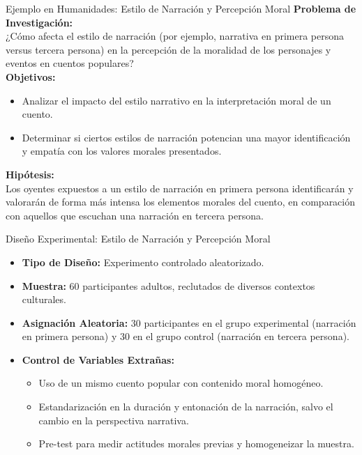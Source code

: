 ﻿\documentclass{beamer}
\begin{document}
\begin{frame}{Ejemplo en Humanidades:  Estilo de Narración y Percepción Moral}
  \textbf{Problema de Investigación:}\\
  ¿Cómo afecta el estilo de narración (por ejemplo, narrativa en primera persona versus tercera persona) en la percepción de la moralidad de los personajes y eventos en cuentos populares?\\[3mm]
  
  \textbf{Objetivos:}
  \begin{itemize}
      \item Analizar el impacto del estilo narrativo en la interpretación moral de un cuento.
      \item Determinar si ciertos estilos de narración potencian una mayor identificación y empatía con los valores morales presentados.
  \end{itemize}
  
  \textbf{Hipótesis:}\\
  Los oyentes expuestos a un estilo de narración en primera persona identificarán y valorarán de forma más intensa los elementos morales del cuento, en comparación con aquellos que escuchan una narración en tercera persona.
\end{frame}

\begin{frame}{Diseño Experimental: Estilo de Narración y Percepción Moral}
  \begin{itemize}
      \item \textbf{Tipo de Diseño:} Experimento controlado aleatorizado.
      \item \textbf{Muestra:} 60 participantes adultos, reclutados de diversos contextos culturales.
      \item \textbf{Asignación Aleatoria:} 30 participantes en el grupo experimental (narración en primera persona) y 30 en el grupo control (narración en tercera persona).
      \item \textbf{Control de Variables Extrañas:}
      \begin{itemize}
          \item Uso de un mismo cuento popular con contenido moral homogéneo.
          \item Estandarización en la duración y entonación de la narración, salvo el cambio en la perspectiva narrativa.
          \item Pre-test para medir actitudes morales previas y homogeneizar la muestra.
      \end{itemize}
  \end{itemize}
\end{frame}
\end{document}
